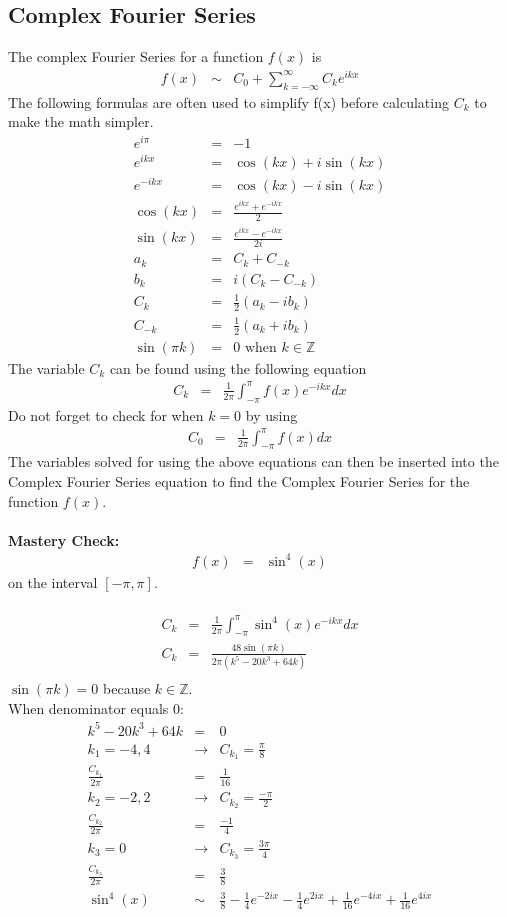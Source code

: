 \documentclass{article}
\def\Z{\mathbb{Z}}
\newcommand{\bea}{\begin{eqnarray*}}
\newcommand{\eea}{\end{eqnarray*}}
\begin{document}
\subsection{Complex Fourier Series}
The complex Fourier Series for a function $f(x)$ is
\bea
f(x) &\sim& C_0+\sum_{k=-\infty}^{\infty}{C_ke^{ikx}}
\eea
The following formulas are often used to simplify f(x) before calculating $C_k$ to make the math simpler.
\bea
e^{i\pi} &=& -1\\
e^{ikx} &=& \cos(kx)+i\sin(kx)\\
e^{-ikx} &=& \cos(kx)-i\sin(kx)\\
\cos(kx) &=& \frac{e^{ikx}+e^{-ikx}}{2}\\
\sin(kx) &=& \frac{e^{ikx}-e^{-ikx}}{2i}\\
a_k &=& C_k+C_{-k}\\
b_k &=& i\left(C_k-C_{-k}\right)\\
C_k &=& \frac{1}{2}\left(a_k-ib_k\right)\\
C_{-k} &=& \frac{1}{2}\left(a_k+ib_k\right)\\
\sin(\pi k) &=& 0 \text{ when } k\in \Z
\eea
The variable $C_k$ can be found using the following equation
\bea
C_k &=& \frac{1}{2\pi}\int_{-\pi}^{\pi}{f(x)e^{-ikx}}dx
\eea
Do not forget to check for when $k=0$ by using
\bea
C_0 &=& \frac{1}{2\pi}\int_{-\pi}^{\pi}{f(x)}dx
\eea
The variables solved for using the above equations can then be inserted into the Complex Fourier Series equation to find the Complex Fourier Series for the function $f(x)$.\\\\
\textbf{Mastery Check:}\\
\bea
f(x) &=& \sin^4(x)
\eea
on the interval $[-\pi,\pi]$.\\\\
\bea
C_k &=& \frac{1}{2\pi}\int_{-\pi}^{\pi}{\sin^4(x)e^{-ikx}}dx\\
C_k &=& \frac{48\sin(\pi k)}{2\pi(k^5-20k^3+64k)}\\
\eea
$\sin(\pi k) = 0$ because $k\in \Z$.\\
When denominator equals 0:
\bea
k^5-20k^3+64k &=& 0\\
k_1 = -4,4 &\longrightarrow& C_{k_1} = \frac{\pi}{8}\\
\frac{C_{k_1}}{2\pi} &=& \frac{1}{16}\\
k_2 = -2,2 &\longrightarrow& C_{k_2} = \frac{-\pi}{2}\\
\frac{C_{k_2}}{2\pi} &=& \frac{-1}{4}\\
k_3 = 0 &\longrightarrow& C_{k_3} = \frac{3\pi}{4}\\
\frac{C_{k_3}}{2\pi} &=& \frac{3}{8}\\
\sin^4(x) &\sim& \frac{3}{8}-\frac{1}{4}e^{-2ix}-\frac{1}{4}e^{2ix}+\frac{1}{16}e^{-4ix}+\frac{1}{16}e^{4ix}\\
\eea
\begin{center}\end{center}
\end{document}
